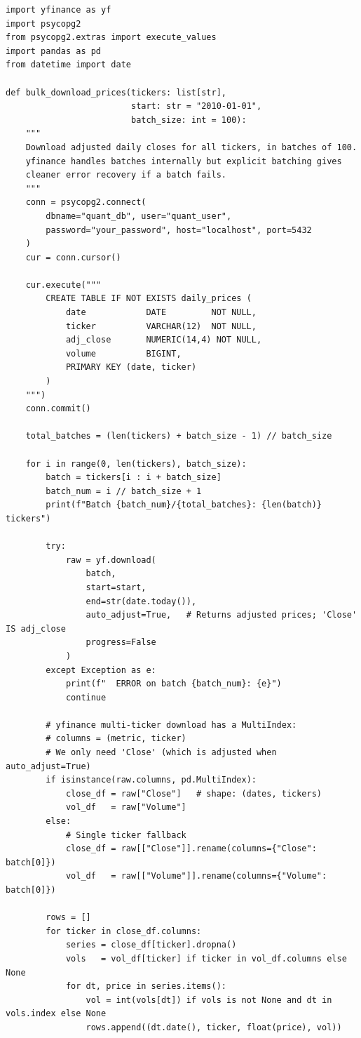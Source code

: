 \documentclass[11pt, oneside]{book}
\begin{document}
\begin{lstlisting}[style=pythonstyle, caption={Bulk Price Download via yfinance (2010--Present)}]
import yfinance as yf
import psycopg2
from psycopg2.extras import execute_values
import pandas as pd
from datetime import date

def bulk_download_prices(tickers: list[str],
                         start: str = "2010-01-01",
                         batch_size: int = 100):
    """
    Download adjusted daily closes for all tickers, in batches of 100.
    yfinance handles batches internally but explicit batching gives
    cleaner error recovery if a batch fails.
    """
    conn = psycopg2.connect(
        dbname="quant_db", user="quant_user",
        password="your_password", host="localhost", port=5432
    )
    cur = conn.cursor()

    cur.execute("""
        CREATE TABLE IF NOT EXISTS daily_prices (
            date            DATE         NOT NULL,
            ticker          VARCHAR(12)  NOT NULL,
            adj_close       NUMERIC(14,4) NOT NULL,
            volume          BIGINT,
            PRIMARY KEY (date, ticker)
        )
    """)
    conn.commit()

    total_batches = (len(tickers) + batch_size - 1) // batch_size

    for i in range(0, len(tickers), batch_size):
        batch = tickers[i : i + batch_size]
        batch_num = i // batch_size + 1
        print(f"Batch {batch_num}/{total_batches}: {len(batch)} tickers")

        try:
            raw = yf.download(
                batch,
                start=start,
                end=str(date.today()),
                auto_adjust=True,   # Returns adjusted prices; 'Close' IS adj_close
                progress=False
            )
        except Exception as e:
            print(f"  ERROR on batch {batch_num}: {e}")
            continue

        # yfinance multi-ticker download has a MultiIndex:
        # columns = (metric, ticker)
        # We only need 'Close' (which is adjusted when auto_adjust=True)
        if isinstance(raw.columns, pd.MultiIndex):
            close_df = raw["Close"]   # shape: (dates, tickers)
            vol_df   = raw["Volume"]
        else:
            # Single ticker fallback
            close_df = raw[["Close"]].rename(columns={"Close": batch[0]})
            vol_df   = raw[["Volume"]].rename(columns={"Volume": batch[0]})

        rows = []
        for ticker in close_df.columns:
            series = close_df[ticker].dropna()
            vols   = vol_df[ticker] if ticker in vol_df.columns else None
            for dt, price in series.items():
                vol = int(vols[dt]) if vols is not None and dt in vols.index else None
                rows.append((dt.date(), ticker, float(price), vol))


\end{lstlisting}
\end{document}
